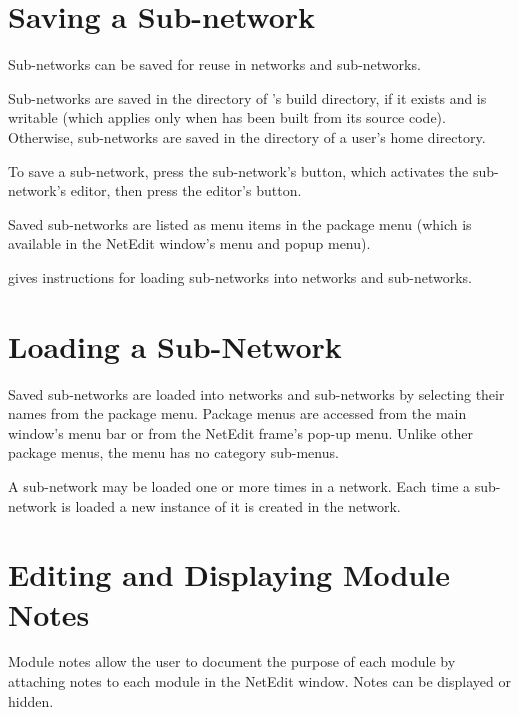 \section{Saving a Sub-network}
\label{sec:savesubnet}

Sub-networks can be saved for reuse in networks and sub-networks.

Sub-networks are saved in the  directory of \sr{}'s
build directory, if it exists and is writable (which applies only when
\sr{} has been built from its source code).  Otherwise, sub-networks
are saved in the  directory of a user's home
directory.

To save a sub-network, press the sub-network's 
button, which activates the sub-network's editor, then press the
editor's  button.

Saved sub-networks are listed as menu items in the 
package menu (which is available in the NetEdit window's 
menu and popup menu).

 gives instructions for
loading sub-networks into networks and sub-networks.

\section{Loading a Sub-Network}
\label{sec:loadsubnet}

Saved sub-networks are loaded into networks and sub-networks by
selecting their names from the  package menu.
Package menus are accessed from the main window's menu bar or from the
NetEdit frame's pop-up menu.  Unlike other package menus, the
 menu has no category sub-menus.

A sub-network may be loaded one or more times in a network.  Each time
a sub-network is loaded a new instance of it is created in the
network.

\section{Editing and Displaying Module Notes}
\label{sec:modnotes}

Module notes allow the user to document the purpose of each module by
attaching notes to each module in the NetEdit window.  Notes can be
displayed or hidden.

